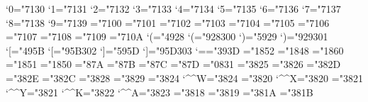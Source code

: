\newfam\euexfam %
\newfam\frfam %
\newfam\cmfam %
\def\hat{\mathaccent"95E }
\def\tilde{\mathaccent"A7E }
\mathcode`0="7130
\mathcode`1="7131
\mathcode`2="7132
\mathcode`3="7133
\mathcode`4="7134
\mathcode`5="7135
\mathcode`6="7136
\mathcode`7="7137
\mathcode`8="7138
\mathcode`9="7139
\mathchardef\Gamma="7100
\mathchardef\Delta="7101
\mathchardef\Theta="7102
\mathchardef\Lambda="7103
\mathchardef\Xi="7104
\mathchardef\Pi="7105
\mathchardef\Sigma="7106
\mathchardef\Upsilon="7107
\mathchardef\Phi="7108
\mathchardef\Psi="7109
\mathchardef\Omega="710A
\let\varsigma=\sigma \let\varrho=\rho %
\mathcode`(="4928 \delcode`(="928300
\mathcode`)="5929 \delcode`)="929301
\mathcode`[="495B \delcode`[="95B302
\mathcode`]="595D \delcode`]="95D303
\mathcode`=="393D
\mathchardef\intop="1852
\mathchardef\ointop="1848
\mathchardef\coprod="1860
\mathchardef\prod="1851
\mathchardef\sum="1850
\mathchardef\braceld="87A \mathchardef\bracerd="87B
\mathchardef\bracelu="87C \mathchardef\braceru="87D
\mathchardef\infty="0831
\mathchardef\nearrow="3825
\mathchardef\searrow="3826
\mathchardef\nwarrow="382D
\mathchardef\swarrow="382E
\mathchardef\Leftrightarrow="382C
\mathchardef\Leftarrow="3828
\mathchardef\Rightarrow="3829
\mathchardef\leftrightarrow="3824 \mathcode`\^^W="3824
\mathchardef\leftarrow="3820 \let\gets=\leftarrow \mathcode`\^^X="3820
\mathchardef\rightarrow="3821 \let\to=\rightarrow \mathcode`\^^Y="3821
\def\uparrow{\delimiter"3822378 } \mathcode`\^^K="3822
\def\downarrow{\delimiter"3823379 } \mathcode`\^^A="3823
\def\updownarrow{\delimiter"386C33F }
\def\Uparrow{\delimiter"382A37E }
\def\Downarrow{\delimiter"382B37F }
\def\Updownarrow{\delimiter"386D377 }
\mathchardef\leftharpoonup="3818
\mathchardef\leftharpoondown="3819
\mathchardef\rightharpoonup="381A
\mathchardef\rightharpoondown="381B

\def\set_families#1#2#3{%
  \textfont0=\macro{#1_rm}\scriptfont0=\macro{#2_rm}%
    \scriptscriptfont0=\macro{#3_rm}%
  \textfont1=\macro{#1_i}\scriptfont1=\macro{#2_i}%
    \scriptscriptfont1=\macro{#3_i}%
  \textfont2=\macro{#1_sy}\scriptfont2=\macro{#2_sy}%
    \scriptscriptfont2=\macro{#3_sy}%
  \textfont3=\macro{#1_ex}\scriptfont3=\macro{#1_ex}%
    \scriptscriptfont3=\macro{#1_ex}%
  \textfont\bffam=\macro{#1_bf}%
  \textfont\itfam=\macro{#1_it}%
  \textfont\ttfam=\macro{#1_tt}%
  \textfont\frfam=\macro{#1_fr}\scriptfont\frfam=\macro{#2_fr}%
    \scriptscriptfont\frfam=\macro{#3_fr}%
  \textfont\euexfam=\macro{#1_euex}%
  \textfont\cmfam=\macro{#1_cm}\scriptfont\cmfam=\macro{#2_cm}%
    \scriptscriptfont\cmfam=\macro{#3_cm}%
}

